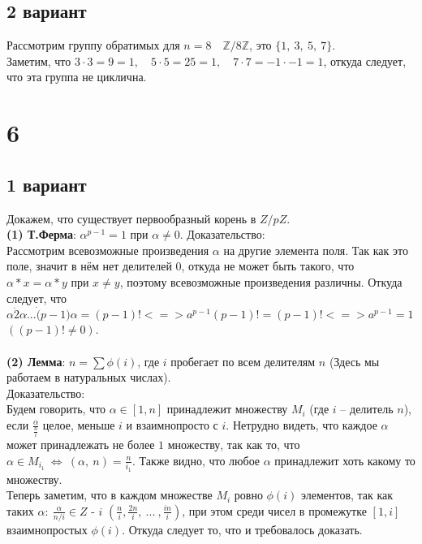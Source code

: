 	\subsection{2 вариант}
		Рассмотрим группу обратимых для $n = 8 \quad \mathbb{Z}/ 8 \mathbb{Z}$, это $\{ 1,\ 3,\ 5,\ 7 \}$.\\
		Заметим, что $3 \cdot 3 = 9 = 1,\quad 5 \cdot 5 = 25 = 1,\quad 7 \cdot 7 = -1 \cdot -1 = 1$, откуда следует, что эта группа не циклична.
		
\newpage		
\section{6}
	\subsection{1 вариант}
		Докажем, что существует первообразный корень в $Z/pZ$.\\
		\textbf{(1) Т.Ферма}: $\alpha^{p-1} = 1$ при $\alpha \ne 0$. Доказательство:\\
		Рассмотрим всевозможные произведения $\alpha$ на другие элемента поля. Так как это поле, значит в нём нет делителей $0$, откуда не может быть такого, что $\alpha*x = \alpha * y$ при $x \ne y$, поэтому всевозможные произведения различны. Откуда следует, что $\alpha \dot 2\alpha \dot ... \dot (p-1)\alpha = (p-1)!  <=>  a^{p-1}(p-1)! = (p-1)!  <=> a^{p-1} = 1$ $((p-1)! \ne 0)$.\\ \\
		\textbf{(2) Лемма}: $n = \sum \phi (i)$, где $i$ пробегает по всем делителям $n$ (Здесь мы работаем в натуральных числах).\\
		Доказательство:\\
		Будем говорить, что $\alpha \in [1,n]$ принадлежит множеству $M_i$ (где $i$ -- делитель $n$), если $\frac{\alpha}{\frac{n}{i}}$ целое, меньше $i$ и взаимнопросто с $i$. Нетрудно видеть, что каждое $\alpha$ может принадлежать не более $1$ множеству, так как то, что $\alpha \in M_{i_1} \ \Leftrightarrow \ (\alpha,\ n) = \frac{n}{i_1}$. Также видно, что любое $\alpha$ принадлежит хоть какому то множеству.\\ 
		Теперь заметим, что в каждом множестве $M_i$ ровно $\phi(i)$ элементов, так как таких $\alpha:\ \frac{\alpha}{n/i} \in Z$ - $i$ $(\frac{n}{i}, \frac{2n}{i},\ ... \: , \frac{in}{i})$, при этом среди чисел в промежутке $[1,i]$ взаимнопростых $\phi(i)$. Откуда следует то, что и требовалось доказать.\\ \\
